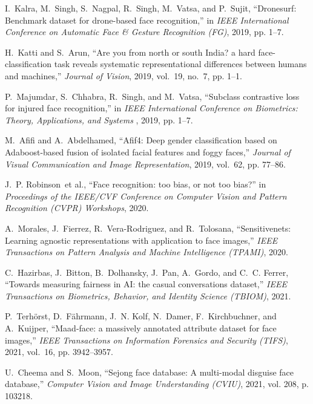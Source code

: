 \documentclass[journal]{IEEEtran}
\begin{document}
\begin{thebibliography}{100}
I.~Kalra, M.~Singh, S.~Nagpal, R.~Singh, M.~Vatsa, and P.~Sujit, ``Dronesurf: Benchmark dataset for drone-based face recognition,'' in \emph{IEEE
  International Conference on Automatic Face \& Gesture Recognition (FG)}, 2019, pp. 1--7.

H.~Katti and S.~Arun, ``Are you from north or south India? a hard face-classification task reveals systematic representational differences between humans and machines,'' \emph{Journal of Vision}, 2019, vol.~19, no.~7, pp.
  1--1.

P.~Majumdar, S.~Chhabra, R.~Singh, and M.~Vatsa, ``Subclass contrastive loss for injured face recognition,'' in \emph{IEEE International Conference on Biometrics: Theory, Applications, and Systems }, 2019, pp. 1--7.

M.~Afifi and A.~Abdelhamed, ``Afif4: Deep gender classification based on
  Adaboost-based fusion of isolated facial features and foggy faces,''
  \emph{Journal of Visual Communication and Image Representation}, 2019, vol.~62, pp.
  77--86.

J.~P. Robinson~et al., ``Face recognition: too bias, or not too bias?'' in \emph{Proceedings of the IEEE/CVF Conference on Computer Vision and Pattern Recognition (CVPR) Workshops}, 2020.

A.~Morales, J.~Fierrez, R.~Vera-Rodriguez, and R.~Tolosana, ``Sensitivenets: Learning agnostic representations with application to face images,''
  \emph{IEEE Transactions on Pattern Analysis and Machine Intelligence (TPAMI)}, 2020.

C.~Hazirbas, J.~Bitton, B.~Dolhansky, J.~Pan, A.~Gordo, and C.~C. Ferrer, ``Towards measuring fairness in AI: the casual conversations dataset,'' \emph{IEEE Transactions on Biometrics, Behavior, and Identity Science (TBIOM)}, 2021.

P.~Terh{\"o}rst, D.~F{\"a}hrmann, J.~N. Kolf, N.~Damer, F.~Kirchbuchner, and A.~Kuijper, ``Maad-face: a massively annotated attribute dataset for face images,'' \emph{IEEE Transactions on Information Forensics and Security (TIFS)}, 2021, vol.~16, pp. 3942--3957.

U.~Cheema and S.~Moon, ``Sejong face database: A multi-modal disguise face database,'' \emph{Computer Vision and Image Understanding (CVIU)}, 2021, vol. 208, p.
  103218.


\end{thebibliography}
\end{document}
